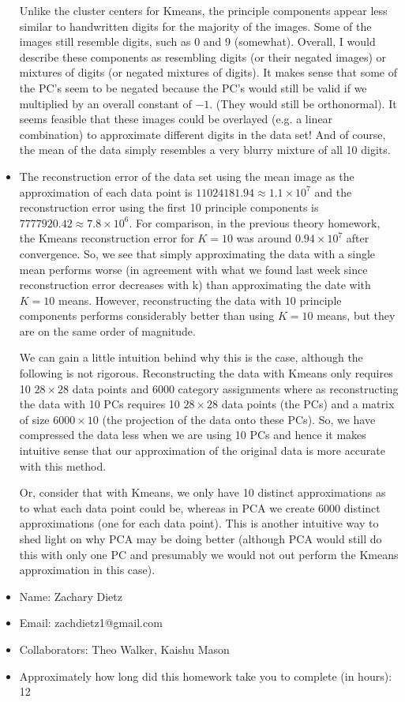 \documentclass[submit]{harvardml}
\begin{document}
\begin{itemize}
Unlike the cluster centers for Kmeans, the principle components appear less similar to handwritten digits for the majority of the images. Some of the images still resemble digits, such as 0 and 9 (somewhat). Overall, I would describe these components as resembling digits (or their negated images) or mixtures of digits (or negated mixtures of digits). It makes sense that some of the PC's seem to be negated because the PC's would still be valid if we multiplied by an overall constant of $-1$. (They would still be orthonormal). It seems feasible that these images could be overlayed (e.g. a linear combination) to approximate different digits in the data set! And of course, the mean of the data simply resembles a very blurry mixture of all 10 digits. 

\item The reconstruction error of the data set using the mean image as the approximation of each data point is $\boxed{11024181.94 \approx 1.1 \times 10^{7}}$ and the reconstruction error using the first 10 principle components is $\boxed{7777920.42 \approx 7.8 \times 10^6}$. For comparison, in the previous theory homework, the Kmeans reconstruction error for $K=10$ was around $0.94\times 10^7$ after convergence. So, we see that simply approximating the data with a single mean performs worse (in agreement with what we found last week since reconstruction error decreases with k) than approximating the date with $K=10$ means. However, reconstructing the data with $10$ principle components performs considerably better than using $K=10$ means, but they are on the same order of magnitude. 

We can gain a little intuition behind why this is the case, although the following is not rigorous. Reconstructing the data with Kmeans only requires 10 $28\times 28$ data points and $6000$ category assignments where as reconstructing the data with 10 PCs requires 10 $28\times 28$ data points (the PCs) and a matrix of size $6000 \times 10$ (the projection of the data onto these PCs). So, we have compressed the data less when we are using 10 PCs and hence it makes intuitive sense that our approximation of the original data is more accurate with this method.

Or, consider that with Kmeans, we only have 10 distinct approximations as to what each data point could be, whereas in PCA we create $6000$ distinct approximations (one for each data point). This is another intuitive way to shed light on why PCA may be doing better (although PCA would still do this with only one PC and presumably we would not out perform the Kmeans approximation in this case).


\end{itemize}


\newpage

\begin{itemize}
    \item Name: Zachary Dietz
    \item Email: zachdietz1@gmail.com
    \item Collaborators: Theo Walker, Kaishu Mason
    \item Approximately how long did this homework take you to complete (in hours): 12
\end{itemize}
\end{document}
